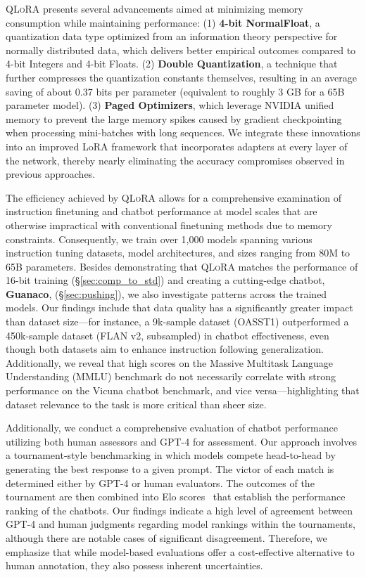 \textsc{QLoRA} presents several advancements aimed at minimizing memory consumption while maintaining performance: (1) \textbf{4-bit NormalFloat}, a quantization data type optimized from an information theory perspective for normally distributed data, which delivers better empirical outcomes compared to 4-bit Integers and 4-bit Floats. (2) \textbf{Double Quantization}, a technique that further compresses the quantization constants themselves, resulting in an average saving of about 0.37 bits per parameter (equivalent to roughly 3 GB for a 65B parameter model). (3) \textbf{Paged Optimizers}, which leverage NVIDIA unified memory to prevent the large memory spikes caused by gradient checkpointing when processing mini-batches with long sequences. We integrate these innovations into an improved LoRA framework that incorporates adapters at every layer of the network, thereby nearly eliminating the accuracy compromises observed in previous approaches.

The efficiency achieved by \textsc{QLoRA} allows for a comprehensive examination of instruction finetuning and chatbot performance at model scales that are otherwise impractical with conventional finetuning methods due to memory constraints. Consequently, we train over 1,000 models spanning various instruction tuning datasets, model architectures, and sizes ranging from 80M to 65B parameters. Besides demonstrating that \textsc{QLoRA} matches the performance of 16-bit training (\S\ref{sec:comp_to_std}) and creating a cutting-edge chatbot, \textbf{Guanaco}, (\S\ref{sec:pushing}), we also investigate patterns across the trained models. Our findings include that data quality has a significantly greater impact than dataset size—for instance, a 9k-sample dataset (OASST1) outperformed a 450k-sample dataset (FLAN v2, subsampled) in chatbot effectiveness, even though both datasets aim to enhance instruction following generalization. Additionally, we reveal that high scores on the Massive Multitask Language Understanding (MMLU) benchmark do not necessarily correlate with strong performance on the Vicuna chatbot benchmark, and vice versa—highlighting that dataset relevance to the task is more critical than sheer size.

Additionally, we conduct a comprehensive evaluation of chatbot performance utilizing both human assessors and GPT-4 for assessment. Our approach involves a tournament-style benchmarking in which models compete head-to-head by generating the best response to a given prompt. The victor of each match is determined either by GPT-4 or human evaluators. The outcomes of the tournament are then combined into Elo scores~\citep{elo1967proposed, elo1978rating} that establish the performance ranking of the chatbots. Our findings indicate a high level of agreement between GPT-4 and human judgments regarding model rankings within the tournaments, although there are notable cases of significant disagreement. Therefore, we emphasize that while model-based evaluations offer a cost-effective alternative to human annotation, they also possess inherent uncertainties.

